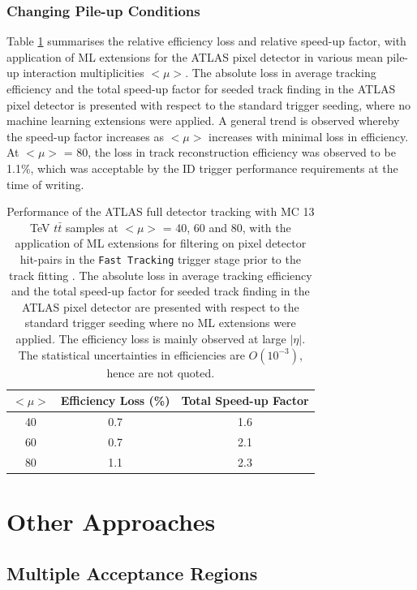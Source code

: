 \subsubsection{Changing Pile-up Conditions}

Table \ref{tab:pileup} summarises the relative efficiency loss and relative speed-up factor, with application of ML extensions for the ATLAS pixel detector in various mean pile-up interaction multiplicities $<\mu>$. The absolute loss in average tracking efficiency and the total speed-up factor for seeded track finding in the ATLAS pixel detector is presented with respect to the standard trigger seeding, where no machine learning extensions were applied. A general trend is observed whereby the speed-up factor increases as $<\mu>$ increases with minimal loss in efficiency. At $<\mu>$ = 80, the loss in track reconstruction efficiency was observed to be 1.1\%, which was acceptable by the ID trigger performance requirements at the time of writing.


\begin{table}[!htbp]
\caption{Performance of the ATLAS full detector tracking with MC 13 TeV $t\bar{t}$ samples at $<\mu>$ = 40, 60 and 80, with the application of ML extensions for filtering on pixel detector hit-pairs in the \texttt{Fast Tracking} trigger stage prior to the track fitting \cite{public-hlt}. The absolute loss in average tracking efficiency and the total speed-up factor for seeded track finding in the ATLAS pixel detector are presented with respect to the standard trigger seeding where no ML extensions were applied. The efficiency loss is mainly observed at large $|\eta|$. The statistical uncertainties in efficiencies are $O(10^{-3})$, hence are not quoted.}
\begin{center}
\begin{tabular}{ccc}
\toprule
$<\mu>$ & Efficiency Loss (\%) & Total Speed-up Factor  \\
\hline
40 & 0.7 & 1.6 \\
60 & 0.7 & 2.1 \\
80 & 1.1 & 2.3 \\
\bottomrule
\end{tabular}
\end{center}
\label{tab:pileup}
\end{table}


\section{Other Approaches}
\subsection{Multiple Acceptance Regions}

